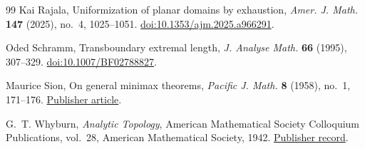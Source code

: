 \begin{thebibliography}{99}
Kai Rajala,
Uniformization of planar domains by exhaustion,
\emph{Amer. J. Math.} \textbf{147} (2025), no.~4, 1025--1051.
\href{https://doi.org/10.1353/ajm.2025.a966291}
{doi:10.1353/ajm.2025.a966291}.

Oded Schramm,
Transboundary extremal length,
\emph{J. Analyse Math.} \textbf{66} (1995), 307--329.
\href{https://doi.org/10.1007/BF02788827}{doi:10.1007/BF02788827}.

Maurice Sion,
On general minimax theorems,
\emph{Pacific J. Math.} \textbf{8} (1958), no.~1, 171--176.
\href{https://msp.org/pjm/1958/8-1/pjm-v8-n1-p14-p.pdf}{Publisher article}.

G.~T. Whyburn,
\emph{Analytic Topology},
American Mathematical Society Colloquium Publications, vol.~28,
American Mathematical Society, 1942.
\href{https://bookstore.ams.org/COLL/28}{Publisher record}.

\end{thebibliography}
